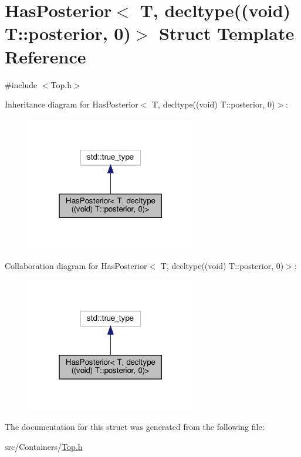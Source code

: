 \hypertarget{struct_has_posterior_3_01_t_00_01decltype_07_07void_08_01_t_1_1posterior_00_010_08_4}{}\section{Has\+Posterior$<$ T, decltype((void) T\+:\+:posterior, 0)$>$ Struct Template Reference}
\label{struct_has_posterior_3_01_t_00_01decltype_07_07void_08_01_t_1_1posterior_00_010_08_4}


{\ttfamily \#include $<$Top.\+h$>$}



Inheritance diagram for Has\+Posterior$<$ T, decltype((void) T\+:\+:posterior, 0)$>$\+:
\nopagebreak
\begin{figure}[H]
\begin{center}
\leavevmode
\includegraphics[width=211pt]{struct_has_posterior_3_01_t_00_01decltype_07_07void_08_01_t_1_1posterior_00_010_08_4__inherit__graph}
\end{center}
\end{figure}


Collaboration diagram for Has\+Posterior$<$ T, decltype((void) T\+:\+:posterior, 0)$>$\+:
\nopagebreak
\begin{figure}[H]
\begin{center}
\leavevmode
\includegraphics[width=211pt]{struct_has_posterior_3_01_t_00_01decltype_07_07void_08_01_t_1_1posterior_00_010_08_4__coll__graph}
\end{center}
\end{figure}


The documentation for this struct was generated from the following file\+:\begin{DoxyCompactItemize}
\item 
src/\+Containers/\hyperlink{_top_8h}{Top.\+h}\end{DoxyCompactItemize}
